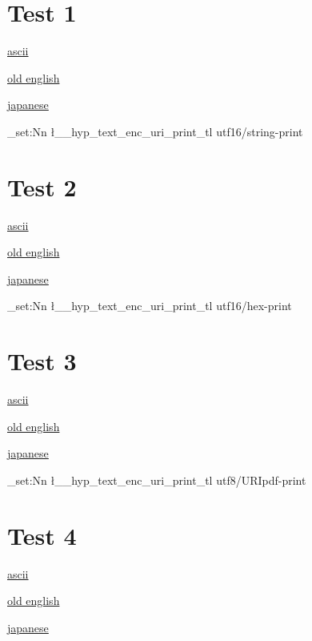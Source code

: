 \documentclass{article}
\begin{document}
\section{Test 1}
\href{https://www.latex-project.org/get/#tex-distributions}{ascii}

\href{https://ang.wikipedia.org/wiki/Elisabeþ_I_Engla_Cwēn}{old english}

\href{https://ja.wikipedia.org/wiki/エリザベス1世_(イングランド女王}{japanese}

\ExplSyntaxOn
\tl_set:Nn \l__hyp_text_enc_uri_print_tl  {utf16/string-print}
\ExplSyntaxOff

\section{Test 2}
\href{https://www.latex-project.org/get/#tex-distributions}{ascii}

\href{https://ang.wikipedia.org/wiki/Elisabeþ_I_Engla_Cwēn}{old english}

\href{https://ja.wikipedia.org/wiki/エリザベス1世_(イングランド女王}{japanese}

\ExplSyntaxOn
\tl_set:Nn \l__hyp_text_enc_uri_print_tl  {utf16/hex-print}
\ExplSyntaxOff

\section{Test 3}
\href{https://www.latex-project.org/get/#tex-distributions}{ascii}

\href{https://ang.wikipedia.org/wiki/Elisabeþ_I_Engla_Cwēn}{old english}

\href{https://ja.wikipedia.org/wiki/エリザベス1世_(イングランド女王}{japanese}

\ExplSyntaxOn
\tl_set:Nn \l__hyp_text_enc_uri_print_tl  {utf8/URIpdf-print}
\ExplSyntaxOff

\section{Test 4}
\href{https://www.latex-project.org/get/#tex-distributions}{ascii}

\href{https://ang.wikipedia.org/wiki/Elisabeþ_I_Engla_Cwēn}{old english}

\href{https://ja.wikipedia.org/wiki/エリザベス1世_(イングランド女王}{japanese}
\end{document}
